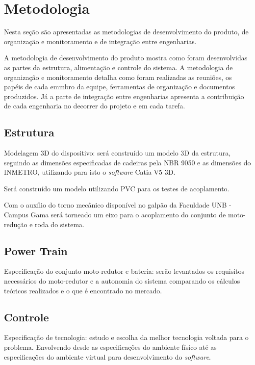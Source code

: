 \chapter[Metodologia]{Metodologia}

Nesta seção são apresentadas as metodologias de desenvolvimento do produto, de organização e monitoramento e de integração entre engenharias.

A metodologia de desenvolvimento do produto mostra como foram desenvolvidas as partes da estrutura, alimentação e controle do sistema. A metodologia de organização e monitoramento detalha como foram realizadas as reuniões, os papéis de cada emmbro da equipe, ferramentas de organização e documentos produzidos. Já a parte de integração entre engenharias apresenta a contribuição de cada engenharia no decorrer do projeto e em cada tarefa.

\section{Estrutura}

Modelagem 3D do dispositivo: será construído um modelo 3D da estrutura, seguindo as dimensões especificadas de cadeiras pela NBR 9050 \cite{nbr9050} e as dimensões do INMETRO, utilizando para isto o \textit{software} Catia V5 3D.

Será construído um modelo utilizando PVC para os testes de acoplamento.

Com o auxílio do torno mecânico disponível no galpão da Faculdade UNB - Campus Gama será torneado um eixo para o acoplamento do conjunto de moto-redução e roda do sistema.

\section{Power Train}

Especificação do conjunto moto-redutor e bateria: serão levantados os requisitos necessários do moto-redutor e a autonomia do sistema comparando os cálculos teóricos realizados e o que é encontrado no mercado.

\section{Controle}

	Especificação de tecnologia: estudo e escolha da melhor tecnologia voltada para o problema. Envolvendo desde as especificações do ambiente físico até as especificações do ambiente virtual para desenvolvimento do \textit{software}.

